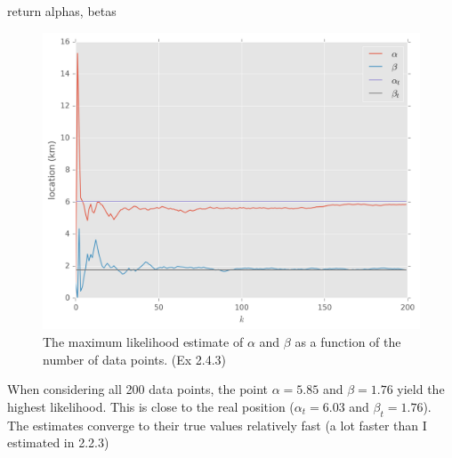\documentclass{article}
\begin{document}
\begin{enumerate}
\begin{python}
    return alphas, betas
\end{python}
\begin{figure}[H]
\centering
\includegraphics[width=.6\textwidth]{images/min_logl.png}
\caption{The maximum likelihood estimate of $\alpha$ and $\beta$ as a function of the number of data points. (Ex 2.4.3)}
\end{figure}
When considering all 200 data points, the point $\alpha = 5.85$ and $\beta = 1.76$ yield the highest likelihood. This is close to the real position ($\alpha_t = 6.03$ and $\beta_t=1.76$). The estimates converge to their true values relatively fast (a lot faster than I estimated in 2.2.3)
\end{enumerate}
\end{document}
